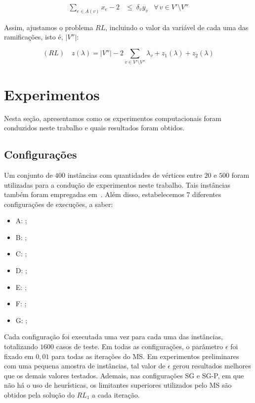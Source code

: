 \documentclass[12pt, a4paper]{article}
\theoremstyle{plain}
\theoremstyle{definition}
\theoremstyle{remark}
\begin{document}
{\abovedisplayskip=0pt
	\begin{align}
		\displaystyle\sum_{e \in A(v)} x_e - 2 &\leq \; \delta_v y_v &\forall \, v \in V' \setminus V'' \label{ramification3}
	\end{align}
}

Assim, ajustamos o problema $RL$, incluindo o valor da variável de cada uma das ramificações, isto é, $|V''|$:

\begin{equation} \label{rl_mod_pre}
	(RL) \quad z(\lambda) = |V''| -2 \sum_{v \in V' \setminus V''}\lambda_v + z_1(\lambda) + z_2(\lambda)
\end{equation}

\section{Experimentos}

Nesta seção, apresentamos como os experimentos computacionais foram conduzidos neste trabalho e quais resultados foram obtidos.
 
\subsection{Configurações}

Um conjunto de $400$ instâncias com quantidades de vértices entre $20$ e $500$ foram utilizadas para a condução de experimentos neste trabalho. Tais instâncias também foram empregadas em~\cite{Carrabs2013}. Além disso, estabelecemos $7$ diferentes configurações de execuções, a saber:

\begin{itemize}[before=\vspace{\baselineskip},after=\vspace{\baselineskip}]
\item A: ;
\item B: ;
\item C: ;
\item D: ;
\item E: ;
\item F: ;
\item G: ;
\end{itemize}

Cada configuração foi executada uma vez para cada uma das instâncias, totalizando $1600$ casos de teste. Em todas as configurações, o parâmetro $\epsilon$ foi fixado em $0,01$ para todas as iterações do MS. Em experimentos preliminares com uma pequena amostra de instâncias, tal valor de $\epsilon$ gerou resultados melhores que os demais valores testados. Ademais, nas configurações SG e SG-P, em que não há o uso de heurísticas, os limitantes superiores utilizados pelo MS são obtidos pela solução do $RL_1$ a cada iteração.
\end{document}
